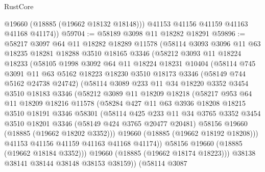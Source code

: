 \begin{lexlean}{RustCore}
\begin{coremodule}
          @19660
          (@18885 (@19662 @18132 @18148)))
        @41153
        @41156
        @41159
        @41163
        @41168
        @41174))
@59704 := @58189 @3098 @11 @18282 @18291
@59896 := @58217
    @3097
    @64
    @11
    @18282
    @18289
    @11578
    (@58114
      @3093
      @3096
      @11
      @63
      @18235
      @18281
      @18288
      @3510
      @18165
      @3346
      (@58212
        @3093
        @11
        @18224
        @18233
        (@58105
          @1998
          @3092
          @64
          @11
          @18224
          @18231
          @10404
          (@58114
            @745
            @3091
            @11
            @63
            @5162
            @18223
            @18230
            @3510
            @18173
            @3346
            (@58149 @744 @5162 @24738 @24742)
            (@58114
              @3089
              @233
              @11
              @34
              @18220
              @3352
              @3454
              @3510
              @18183
              @3346
              (@58212
                @3089
                @11
                @18209
                @18218
                (@58217
                  @953
                  @64
                  @11
                  @18209
                  @18216
                  @11578
                  (@58284
                    @427
                    @11
                    @63
                    @3936
                    @18208
                    @18215
                    @3510
                    @18191
                    @3346
                    @58301
                    (@58114
                      @425
                      @233
                      @11
                      @34
                      @3765
                      @3352
                      @3454
                      @3510
                      @18201
                      @3346
                      (@58149 @424 @3765 @20477 @20481)
                      @58156
                      @19660
                      (@18885 (@19662 @18202 @3352)))
                    @19660
                    (@18885 (@19662 @18192 @18208)))
                  @41153
                  @41156
                  @41159
                  @41163
                  @41168
                  @41174))
              @58156
              @19660
              (@18885 (@19662 @18184 @3352)))
            @19660
            (@18885 (@19662 @18174 @18223)))
          @38138
          @38141
          @38144
          @38148
          @38153
          @38159))
      (@58114
        @3087

\end{coremodule}
\end{lexlean}
